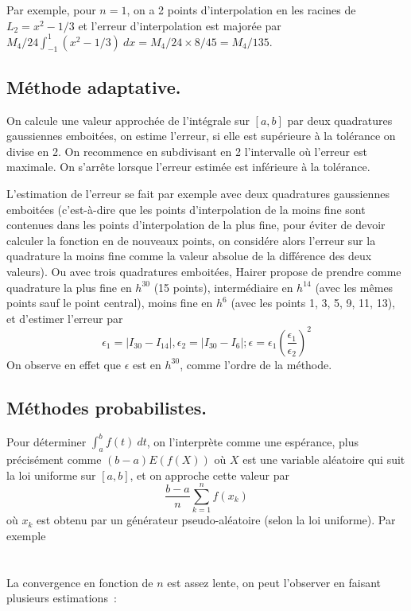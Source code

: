 \documentclass[a4paper,11pt]{article}
\begin{document}
\begin{giacjshere}
Par exemple, pour $n=1$, on a 2 points d'interpolation en les racines
de $L_2=x^2-1/3$ et l'erreur d'interpolation
est major\'ee par $M_4/24\int_{-1}^1(x^2-1/3) \ dx=M_4/24 \times 8/45=M_4/135$.


\subsection{M\'ethode adaptative.}
On calcule une valeur approch\'ee de l'int\'egrale sur $[a,b]$ par
deux quadratures gaussiennes emboit\'ees, on estime l'erreur,
si elle est sup\'erieure \`a la tol\'erance on divise en 2. On
recommence en subdivisant en 2 l'intervalle o\`u l'erreur est
maximale. On s'arr\^ete lorsque l'erreur estim\'ee est inf\'erieure
\`a la tol\'erance.

L'estimation de l'erreur se fait par exemple avec deux quadratures
gaussiennes emboit\'ees (c'est-\`a-dire que les points d'interpolation
de la moins fine sont contenues dans les points d'interpolation de la
plus fine, pour \'eviter de devoir calculer la fonction en de nouveaux
points, on consid\'ere alors l'erreur sur la quadrature la moins fine
comme la valeur absolue de la diff\'erence des deux valeurs). Ou avec
trois quadratures emboit\'ees,
Hairer propose de prendre comme quadrature la plus fine en $h^{30}$
(15 points), interm\'ediaire en $h^{14}$ (avec les m\^emes points
sauf le point central), moins fine en $h^6$ (avec les points 1, 3, 5,
9, 11, 13), et d'estimer l'erreur par 
$$ \epsilon_1=| I_{30}-I_{14}|,  \epsilon_2=| I_{30}-I_{6}|; 
\epsilon = \epsilon_1 \left(\frac{\epsilon_1}{\epsilon_2} \right)^2 $$
On observe en effet que $\epsilon$ est en $h^{30}$, comme
l'ordre de la m\'ethode.

\subsection{M\'ethodes probabilistes.} 
Pour d\'eterminer $\int_a^b f(t) \ dt $, on l'interpr\`ete comme
une esp\'erance, plus pr\'ecis\'ement comme $(b-a)E(f(X))$ 
o\`u $X$ est une variable al\'eatoire
qui suit la loi uniforme sur $[a,b]$, et on approche cette valeur
par 
$$ \frac{b-a}{n} \sum_{k=1}^n f(x_k) $$
o\`u $x_k$ est obtenu par un g\'en\'erateur pseudo-al\'eatoire
(selon la loi uniforme).
Par exemple\\
\\
\\
La convergence en fonction de $n$ est assez lente, on peut l'observer
en faisant plusieurs estimations~:\\
\\


\end{giacjshere}
\end{document}
